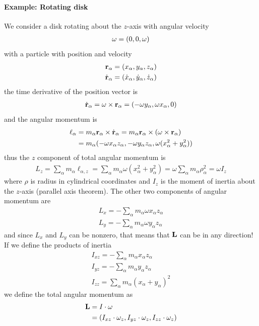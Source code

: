 \documentclass[../main.tex]{subfiles}
\begin{document}
\paragraph*{Example: Rotating disk} We consider a disk rotating about the $z$-axis with angular velocity
\begin{align*}
    \vb \omega = (0, 0, \omega)
\end{align*}
with a particle with position and velocity
\begin{align*}
    \vb r_\alpha = (x_\alpha, y_\alpha, z_\alpha) \\
    \dot{\vb r}_\alpha = (\dot{x}_\alpha, \dot{y}_\alpha, \dot{z}_\alpha)
\end{align*}
the time derivative of the position vector is
\begin{align*}
    \dot{\vb r}_\alpha = \vb \omega \times \vb r_\alpha = (-\omega y_\alpha, \omega x_\alpha, 0)
\end{align*}
and the angular momentum is
\begin{align*}
    \vb \ell_\alpha &= m_\alpha \vb r_\alpha \times \dot{\vb r}_\alpha = m_\alpha \vb r_\alpha \times (\vb \omega \times \vb r_\alpha) \\
    &= m_\alpha(-\omega x_\alpha z_\alpha, -\omega y_\alpha z_\alpha, \omega (x_\alpha^2 + y_\alpha^2))
\end{align*}
thus the $z$ component of total angular momentum is
\begin{align*}
    L_z = \sum_\alpha m_\alpha \ell_{\alpha, z} = \sum_\alpha m_\alpha \omega(x_\alpha^2 + y_\alpha^2)
    = \omega \sum_\alpha m_\alpha \rho_\alpha^2 = \omega I_z
\end{align*}
where $\rho$ is radius in cylindrical coordinates and $I_z$ is the moment of inertia about the $z$-axis (parallel axis theorem).
The other two components of angular momentum are
\begin{align*}
    L_x = -\sum_\alpha m_\alpha \omega x_\alpha z_\alpha \\
    L_y = -\sum_\alpha m_\alpha \omega y_\alpha z_\alpha
\end{align*}
and since $L_x$ and $L_y$ can be nonzero, that means that $\vb L$ can be in any direction! If we define
the products of inertia 
\begin{align*}
    I_{xz} = -\sum_\alpha m_\alpha x_\alpha z_\alpha \\
    I_{yz} = -\sum_\alpha m_\alpha y_\alpha z_\alpha \\
    I_{zz} = \sum_\alpha m_\alpha (x_\alpha + y_\alpha)^2
\end{align*}
we define the total angular momentum as
\begin{align*}
    \vb L &= I \cdot \vb \omega \\
    &= (I_{xz} \cdot \omega_z, I_{yz} \cdot \omega_z, I_{zz} \cdot \omega_z)
\end{align*}
\end{document}
